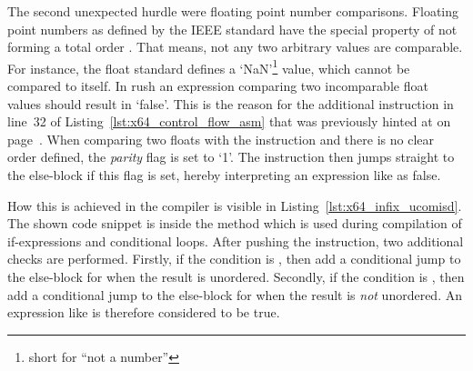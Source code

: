 The second unexpected hurdle were floating point number comparisons.
Floating point numbers as defined by the IEEE standard have the special property of not forming a total order .
That means, not any two arbitrary values are comparable.
For instance, the float standard defines a `NaN'\footnote{short for ``not a number''} value, which cannot be compared to itself.
In rush an expression comparing two incomparable float values should result in `false'.
This is the reason for the additional  instruction in line~32 of Listing~\ref{lst:x64_control_flow_asm} that was previously hinted at on page~\pageref{x64_ucomisd}.
When comparing two floats with the  instruction and there is no clear order defined, the \emph{parity} flag is set to `1'.
The  instruction then jumps straight to the else-block if this flag is set, hereby interpreting an expression like  as false.


How this is achieved in the compiler is visible in Listing~\ref{lst:x64_infix_ucomisd}.
The shown code snippet is inside the  method which is used during compilation of if-expressions and conditional loops.
After pushing the  instruction, two additional checks are performed.
Firstly, if the condition is \qVerb{==}, then add a conditional jump to the else-block for when the result is unordered.
Secondly, if the condition is \qVerb{!=}, then add a conditional jump to the else-block for when the result is \emph{not} unordered.
An expression like  is therefore considered to be true.
